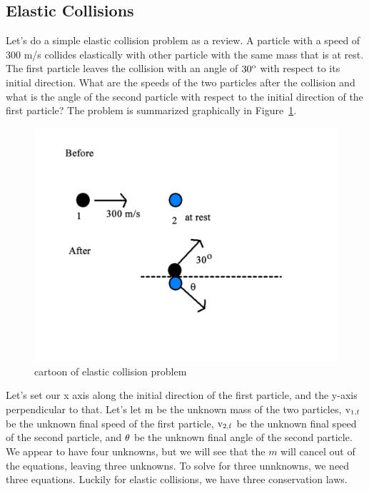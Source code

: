 \subsection{Elastic Collisions}

Let's do a simple elastic collision problem as a review.  A particle with a speed of 300 m/s collides elastically with other particle with the same mass that is at rest.  The first particle leaves the collision with an angle of ${\rm 30^o}$ with respect to its initial direction.  What are the speeds of the two particles after the collision and what is the angle of the second particle with respect to the initial direction of the first particle?  The problem is summarized graphically in Figure~\ref{fig:elastic}.

 
\begin{figure}[h]
\centering\includegraphics[scale=0.5]{./collisions/Pictures/elastic.pdf}
\caption{cartoon of elastic collision problem}
\label{fig:elastic}
\end{figure}

Let's set our x axis along the initial direction of the first particle, and the y-axis perpendicular to that.  Let's let m be the unknown mass of the two particles, 
${\rm v_{1,f}}$ be the unknown final speed of the first particle,
${\rm v_{2,f}}$ be the unknown final speed of the second particle,
and
${\rm \theta}$ be the unknown final angle of the second particle.
We appear to have four unknowns, but we will see that the $m$ will cancel out of the equations, leaving three unknowns.  To solve for three unnknowns, we need three equations.  Luckily for elastic collisions, we have three conservation laws.

